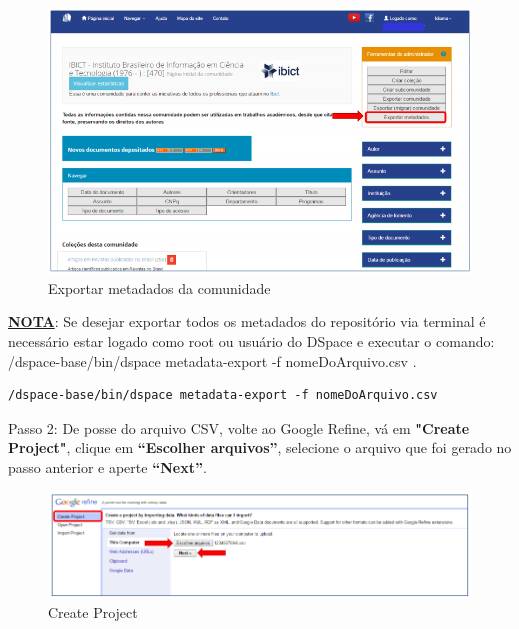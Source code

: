 \documentclass[12pt,hidelinks]{article}
\begin{document}
\newpage

    \begin{figure}[!htp]
                \centering
                \includegraphics[scale=0.7]{figura/Figura184.png}
                \caption{Exportar metadados da comunidade}
            \label{Rotulo}
        \end{figure}
    
    \underline{\textbf{NOTA}}: Se desejar exportar todos os metadados do repositório via terminal é necessário estar logado como root ou usuário do DSpace e executar o comando: /dspace-base/bin/dspace metadata-export -f nomeDoArquivo.csv .
    
    \begin{verbatim}
/dspace-base/bin/dspace metadata-export -f nomeDoArquivo.csv
        \end{verbatim}
    
    Passo 2: De posse do arquivo CSV, volte ao Google Refine, vá em \textbf{"Create Project"}, clique em \textbf{“Escolher arquivos”}, selecione o arquivo que foi gerado no passo anterior e aperte \textbf{“Next”}.
    
    \begin{figure}[!htp]
                \centering
                \includegraphics[scale=0.7]{figura/Figura185.png}
                \caption{Create Project}
            \label{Rotulo}
        \end{figure}
\end{document}
